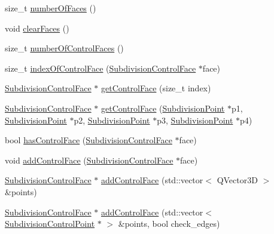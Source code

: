 \begin{DoxyCompactItemize}
\item 
size\-\_\-t \hyperlink{classShipCADGeometry_1_1SubdivisionSurface_a9f67bb8bbd3a8f61a2b4abacc0cf10e4}{number\-Of\-Faces} ()
\item 
void \hyperlink{classShipCADGeometry_1_1SubdivisionSurface_abf11847b9df1bc590c6c51d292430dd5}{clear\-Faces} ()
\item 
size\-\_\-t \hyperlink{classShipCADGeometry_1_1SubdivisionSurface_aefa41641c3665a22adebc66328eb51f7}{number\-Of\-Control\-Faces} ()
\item 
size\-\_\-t \hyperlink{classShipCADGeometry_1_1SubdivisionSurface_aee61b8795a0f16c47df83f0ef0abd2e7}{index\-Of\-Control\-Face} (\hyperlink{classShipCADGeometry_1_1SubdivisionControlFace}{Subdivision\-Control\-Face} $\ast$face)
\item 
\hyperlink{classShipCADGeometry_1_1SubdivisionControlFace}{Subdivision\-Control\-Face} $\ast$ \hyperlink{classShipCADGeometry_1_1SubdivisionSurface_a392f052a12118427919b910e99663d92}{get\-Control\-Face} (size\-\_\-t index)
\item 
\hyperlink{classShipCADGeometry_1_1SubdivisionControlFace}{Subdivision\-Control\-Face} $\ast$ \hyperlink{classShipCADGeometry_1_1SubdivisionSurface_a536574cc453e4790a769a3e7d47b7ff1}{get\-Control\-Face} (\hyperlink{classShipCADGeometry_1_1SubdivisionPoint}{Subdivision\-Point} $\ast$p1, \hyperlink{classShipCADGeometry_1_1SubdivisionPoint}{Subdivision\-Point} $\ast$p2, \hyperlink{classShipCADGeometry_1_1SubdivisionPoint}{Subdivision\-Point} $\ast$p3, \hyperlink{classShipCADGeometry_1_1SubdivisionPoint}{Subdivision\-Point} $\ast$p4)
\item 
bool \hyperlink{classShipCADGeometry_1_1SubdivisionSurface_ad6e00013faf6c373bfc1421adb941ba4}{has\-Control\-Face} (\hyperlink{classShipCADGeometry_1_1SubdivisionControlFace}{Subdivision\-Control\-Face} $\ast$face)
\item 
void \hyperlink{classShipCADGeometry_1_1SubdivisionSurface_abbbb7422a86771451034d2fb7a76bb26}{add\-Control\-Face} (\hyperlink{classShipCADGeometry_1_1SubdivisionControlFace}{Subdivision\-Control\-Face} $\ast$face)
\item 
\hyperlink{classShipCADGeometry_1_1SubdivisionControlFace}{Subdivision\-Control\-Face} $\ast$ \hyperlink{classShipCADGeometry_1_1SubdivisionSurface_a7c83a514f43b868b5fa286f3bc05a41e}{add\-Control\-Face} (std\-::vector$<$ Q\-Vector3\-D $>$ \&points)
\item 
\hyperlink{classShipCADGeometry_1_1SubdivisionControlFace}{Subdivision\-Control\-Face} $\ast$ \hyperlink{classShipCADGeometry_1_1SubdivisionSurface_a957b534788873921249cd1cc058b9d7e}{add\-Control\-Face} (std\-::vector$<$ \hyperlink{classShipCADGeometry_1_1SubdivisionControlPoint}{Subdivision\-Control\-Point} $\ast$ $>$ \&points, bool check\-\_\-edges)

\end{DoxyCompactItemize}
